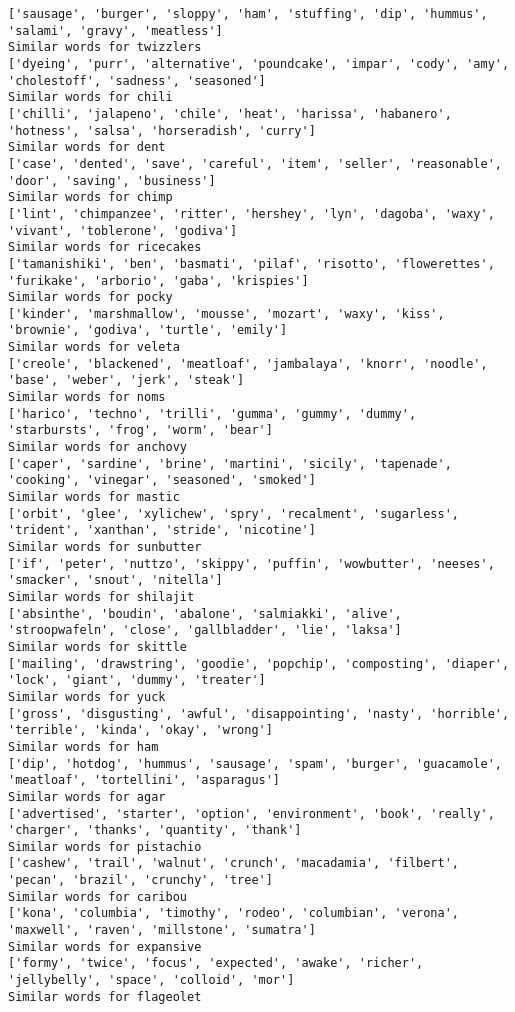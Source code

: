\documentclass[11pt]{article}
\begin{document}
\begin{Verbatim}[commandchars=\\\{\}]
['sausage', 'burger', 'sloppy', 'ham', 'stuffing', 'dip', 'hummus', 'salami', 'gravy', 'meatless']
Similar words for twizzlers
['dyeing', 'purr', 'alternative', 'poundcake', 'impar', 'cody', 'amy', 'cholestoff', 'sadness', 'seasoned']
Similar words for chili
['chilli', 'jalapeno', 'chile', 'heat', 'harissa', 'habanero', 'hotness', 'salsa', 'horseradish', 'curry']
Similar words for dent
['case', 'dented', 'save', 'careful', 'item', 'seller', 'reasonable', 'door', 'saving', 'business']
Similar words for chimp
['lint', 'chimpanzee', 'ritter', 'hershey', 'lyn', 'dagoba', 'waxy', 'vivant', 'toblerone', 'godiva']
Similar words for ricecakes
['tamanishiki', 'ben', 'basmati', 'pilaf', 'risotto', 'flowerettes', 'furikake', 'arborio', 'gaba', 'krispies']
Similar words for pocky
['kinder', 'marshmallow', 'mousse', 'mozart', 'waxy', 'kiss', 'brownie', 'godiva', 'turtle', 'emily']
Similar words for veleta
['creole', 'blackened', 'meatloaf', 'jambalaya', 'knorr', 'noodle', 'base', 'weber', 'jerk', 'steak']
Similar words for noms
['harico', 'techno', 'trilli', 'gumma', 'gummy', 'dummy', 'starbursts', 'frog', 'worm', 'bear']
Similar words for anchovy
['caper', 'sardine', 'brine', 'martini', 'sicily', 'tapenade', 'cooking', 'vinegar', 'seasoned', 'smoked']
Similar words for mastic
['orbit', 'glee', 'xylichew', 'spry', 'recalment', 'sugarless', 'trident', 'xanthan', 'stride', 'nicotine']
Similar words for sunbutter
['if', 'peter', 'nuttzo', 'skippy', 'puffin', 'wowbutter', 'neeses', 'smacker', 'snout', 'nitella']
Similar words for shilajit
['absinthe', 'boudin', 'abalone', 'salmiakki', 'alive', 'stroopwafeln', 'close', 'gallbladder', 'lie', 'laksa']
Similar words for skittle
['mailing', 'drawstring', 'goodie', 'popchip', 'composting', 'diaper', 'lock', 'giant', 'dummy', 'treater']
Similar words for yuck
['gross', 'disgusting', 'awful', 'disappointing', 'nasty', 'horrible', 'terrible', 'kinda', 'okay', 'wrong']
Similar words for ham
['dip', 'hotdog', 'hummus', 'sausage', 'spam', 'burger', 'guacamole', 'meatloaf', 'tortellini', 'asparagus']
Similar words for agar
['advertised', 'starter', 'option', 'environment', 'book', 'really', 'charger', 'thanks', 'quantity', 'thank']
Similar words for pistachio
['cashew', 'trail', 'walnut', 'crunch', 'macadamia', 'filbert', 'pecan', 'brazil', 'crunchy', 'tree']
Similar words for caribou
['kona', 'columbia', 'timothy', 'rodeo', 'columbian', 'verona', 'maxwell', 'raven', 'millstone', 'sumatra']
Similar words for expansive
['formy', 'twice', 'focus', 'expected', 'awake', 'richer', 'jellybelly', 'space', 'colloid', 'mor']
Similar words for flageolet

\end{Verbatim}
\end{document}
